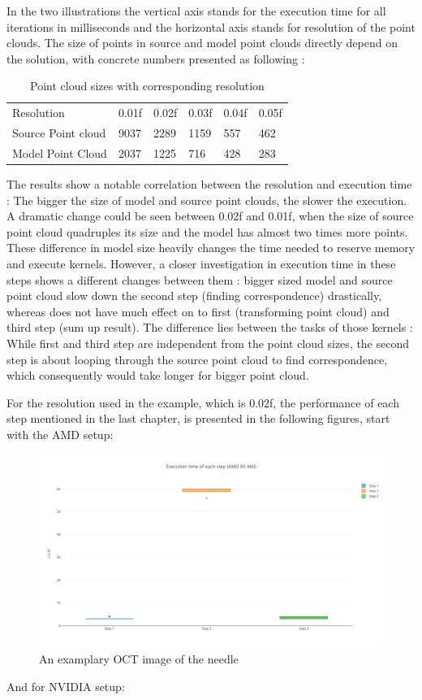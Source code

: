 In the two illustrations the vertical axis stands for the execution time for all iterations in milliseconds and the horizontal axis stands for resolution of the point clouds. The size of points in source and model point clouds directly depend on the solution, with concrete numbers presented as following :



\begin{table}[H]
\centering
\caption{Point cloud sizes with corresponding resolution}
\label{my-label}
\begin{tabular}{llllll}
Resolution         & 0.01f & 0.02f & 0.03f & 0.04f & 0.05f \\
Source Point cloud & 9037  & 2289  & 1159  & 557   & 462   \\
Model Point Cloud  & 2037  & 1225  & 716   & 428   & 283  
\end{tabular}
\end{table}
\newpage
The results show a notable correlation between the resolution and execution time :  The bigger the size of model and source point clouds, the slower the execution. A dramatic change could be seen between 0.02f and 0.01f, when the size of source point cloud quadruples its size and the model has almost two times more points. These difference in model size heavily changes the time needed to reserve memory and execute kernels. However, a closer investigation in execution time in these steps shows a different changes between them : bigger sized model and source point cloud slow down the second step (finding correspondence) drastically, whereas does not have much effect on to first (transforming point cloud) and third step (sum up result). The difference lies between the tasks of those kernels : While first and third step are independent from the point cloud sizes, the second step is about looping through the source point cloud to find correspondence, which consequently would take longer for bigger point cloud. 

For the resolution used in the example, which is 0.02f, the performance of each step mentioned in the last chapter, is presented in the following figures, start with the AMD setup:

\begin{figure}[H]
	\centering
	\includegraphics[width=14cm]{images/EachstepAMD.png}
	\caption{An examplary OCT image of the needle}
	\label{ExampleOCTImage}
\end{figure}
\newpage
And for NVIDIA setup:

